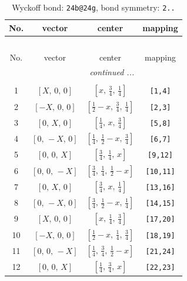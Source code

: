 \documentclass[fleqn,8pt]{jsarticle}
\begin{document}
\begin{longtable}{cccc}
\caption{Wyckoff bond: {\tt 24b@24g}, bond symmetry: {\tt 2..}}
 \\
 \hline \hline
No. & vector & center & mapping \\ \hline \endfirsthead

\multicolumn{3}{l}{\tablename\ \thetable{}} \\
 \hline \hline
No. & vector & center & mapping \\ \hline \endhead

 \hline \hline
\multicolumn{3}{r}{\footnotesize\it continued ...} \\ \endfoot

 \hline \hline
\multicolumn{3}{r}{} \\ \endlastfoot

1 & $\left[ X,\, 0,\, 0 \right]$ & $\left[ x,\, \frac{3}{4},\, \frac{1}{4} \right]$ & {\tt [1,4]} \\ \hline
2 & $\left[ - X,\, 0,\, 0 \right]$ & $\left[ \frac{1}{2} - x,\, \frac{3}{4},\, \frac{1}{4} \right]$ & {\tt [2,3]} \\ \hline
3 & $\left[ 0,\, X,\, 0 \right]$ & $\left[ \frac{1}{4},\, x,\, \frac{3}{4} \right]$ & {\tt [5,8]} \\ \hline
4 & $\left[ 0,\, - X,\, 0 \right]$ & $\left[ \frac{1}{4},\, \frac{1}{2} - x,\, \frac{3}{4} \right]$ & {\tt [6,7]} \\ \hline
5 & $\left[ 0,\, 0,\, X \right]$ & $\left[ \frac{3}{4},\, \frac{1}{4},\, x \right]$ & {\tt [9,12]} \\ \hline
6 & $\left[ 0,\, 0,\, - X \right]$ & $\left[ \frac{3}{4},\, \frac{1}{4},\, \frac{1}{2} - x \right]$ & {\tt [10,11]} \\ \hline
7 & $\left[ 0,\, X,\, 0 \right]$ & $\left[ \frac{3}{4},\, x,\, \frac{1}{4} \right]$ & {\tt [13,16]} \\ \hline
8 & $\left[ 0,\, - X,\, 0 \right]$ & $\left[ \frac{3}{4},\, \frac{1}{2} - x,\, \frac{1}{4} \right]$ & {\tt [14,15]} \\ \hline
9 & $\left[ X,\, 0,\, 0 \right]$ & $\left[ x,\, \frac{1}{4},\, \frac{3}{4} \right]$ & {\tt [17,20]} \\ \hline
10 & $\left[ - X,\, 0,\, 0 \right]$ & $\left[ \frac{1}{2} - x,\, \frac{1}{4},\, \frac{3}{4} \right]$ & {\tt [18,19]} \\ \hline
11 & $\left[ 0,\, 0,\, - X \right]$ & $\left[ \frac{1}{4},\, \frac{3}{4},\, \frac{1}{2} - x \right]$ & {\tt [21,24]} \\ \hline
12 & $\left[ 0,\, 0,\, X \right]$ & $\left[ \frac{1}{4},\, \frac{3}{4},\, x \right]$ & {\tt [22,23]} \\ \hline

\end{longtable}
\end{document}
